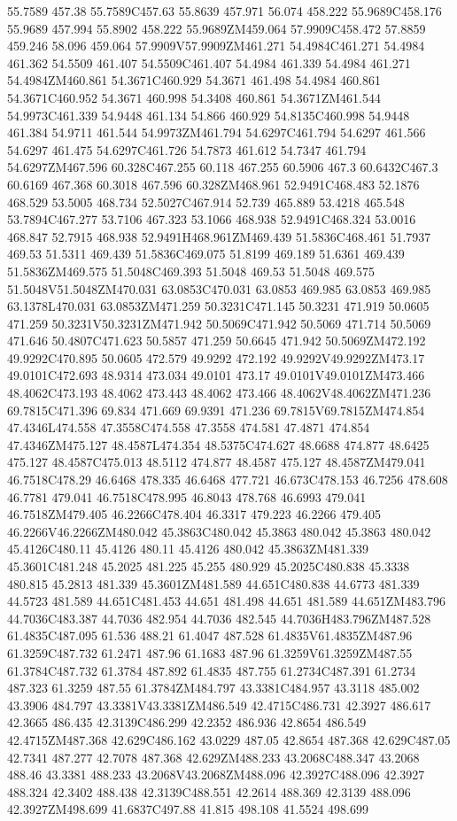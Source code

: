 55.7589 457.38 55.7589C457.63 55.8639 457.971 56.074 458.222 55.9689C458.176 55.9689 457.994 55.8902 458.222 55.9689ZM459.064 57.9909C458.472 57.8859 459.246 58.096 459.064 57.9909V57.9909ZM461.271 54.4984C461.271 54.4984 461.362 54.5509 461.407 54.5509C461.407 54.4984 461.339 54.4984 461.271 54.4984ZM460.861 54.3671C460.929 54.3671 461.498 54.4984 460.861 54.3671C460.952 54.3671 460.998 54.3408 460.861 54.3671ZM461.544 54.9973C461.339 54.9448 461.134 54.866 460.929 54.8135C460.998 54.9448 461.384 54.9711 461.544 54.9973ZM461.794 54.6297C461.794 54.6297 461.566 54.6297 461.475 54.6297C461.726 54.7873 461.612 54.7347 461.794 54.6297ZM467.596 60.328C467.255 60.118 467.255 60.5906 467.3 60.6432C467.3 60.6169 467.368 60.3018 467.596 60.328ZM468.961 52.9491C468.483 52.1876 468.529 53.5005 468.734 52.5027C467.914 52.739 465.889 53.4218 465.548 53.7894C467.277 53.7106 467.323 53.1066 468.938 52.9491C468.324 53.0016 468.847 52.7915 468.938 52.9491H468.961ZM469.439 51.5836C468.461 51.7937 469.53 51.5311 469.439 51.5836C469.075 51.8199 469.189 51.6361 469.439 51.5836ZM469.575 51.5048C469.393 51.5048 469.53 51.5048 469.575 51.5048V51.5048ZM470.031 63.0853C470.031 63.0853 469.985 63.0853 469.985 63.1378L470.031 63.0853ZM471.259 50.3231C471.145 50.3231 471.919 50.0605 471.259 50.3231V50.3231ZM471.942 50.5069C471.942 50.5069 471.714 50.5069 471.646 50.4807C471.623 50.5857 471.259 50.6645 471.942 50.5069ZM472.192 49.9292C470.895 50.0605 472.579 49.9292 472.192 49.9292V49.9292ZM473.17 49.0101C472.693 48.9314 473.034 49.0101 473.17 49.0101V49.0101ZM473.466 48.4062C473.193 48.4062 473.443 48.4062 473.466 48.4062V48.4062ZM471.236 69.7815C471.396 69.834 471.669 69.9391 471.236 69.7815V69.7815ZM474.854 47.4346L474.558 47.3558C474.558 47.3558 474.581 47.4871 474.854 47.4346ZM475.127 48.4587L474.354 48.5375C474.627 48.6688 474.877 48.6425 475.127 48.4587C475.013 48.5112 474.877 48.4587 475.127 48.4587ZM479.041 46.7518C478.29 46.6468 478.335 46.6468 477.721 46.673C478.153 46.7256 478.608 46.7781 479.041 46.7518C478.995 46.8043 478.768 46.6993 479.041 46.7518ZM479.405 46.2266C478.404 46.3317 479.223 46.2266 479.405 46.2266V46.2266ZM480.042 45.3863C480.042 45.3863 480.042 45.3863 480.042 45.4126C480.11 45.4126 480.11 45.4126 480.042 45.3863ZM481.339 45.3601C481.248 45.2025 481.225 45.255 480.929 45.2025C480.838 45.3338 480.815 45.2813 481.339 45.3601ZM481.589 44.651C480.838 44.6773 481.339 44.5723 481.589 44.651C481.453 44.651 481.498 44.651 481.589 44.651ZM483.796 44.7036C483.387 44.7036 482.954 44.7036 482.545 44.7036H483.796ZM487.528 61.4835C487.095 61.536 488.21 61.4047 487.528 61.4835V61.4835ZM487.96 61.3259C487.732 61.2471 487.96 61.1683 487.96 61.3259V61.3259ZM487.55 61.3784C487.732 61.3784 487.892 61.4835 487.755 61.2734C487.391 61.2734 487.323 61.3259 487.55 61.3784ZM484.797 43.3381C484.957 43.3118 485.002 43.3906 484.797 43.3381V43.3381ZM486.549 42.4715C486.731 42.3927 486.617 42.3665 486.435 42.3139C486.299 42.2352 486.936 42.8654 486.549 42.4715ZM487.368 42.629C486.162 43.0229 487.05 42.8654 487.368 42.629C487.05 42.7341 487.277 42.7078 487.368 42.629ZM488.233 43.2068C488.347 43.2068 488.46 43.3381 488.233 43.2068V43.2068ZM488.096 42.3927C488.096 42.3927 488.324 42.3402 488.438 42.3139C488.551 42.2614 488.369 42.3139 488.096 42.3927ZM498.699 41.6837C497.88 41.815 498.108 41.5524 498.699 